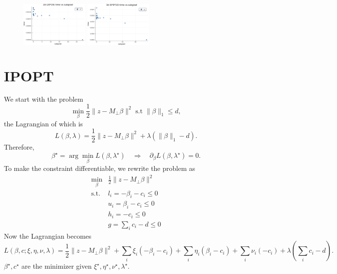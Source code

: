 \documentclass{article}
\begin{document}
\begin{figure}[H]
{\begin{minipage}[b]{1\textwidth}
		 	\includegraphics[width=0.3\textwidth]{2dtimevssubgrad.png}
            \includegraphics[width=0.3\textwidth]{3dtimevssubgrad.png}
    		\end{minipage}
		}
\end{figure}

\section{IPOPT}
We start with the problem
\begin{equation}
    \min_{\beta} \frac{1}{2}\|z-M_{\perp}\beta\|^2 \text{ s.t }\|\beta\|_1\leq d,
\end{equation}
the Lagrangian of which is
\begin{equation}
    L(\beta, \lambda) = \frac{1}{2}\|z-M_{\perp}\beta\|^2 + \lambda(\|\beta\|_1-d).
\end{equation}
Therefore,
\begin{equation}
   \beta^\star = \arg\min_{\beta} L(\beta, \lambda^\star) \quad\Rightarrow \quad\partial_{\beta} L(\beta, \lambda^\star) = 0. 
\end{equation}
To make the constraint differentiable, we rewrite the problem as
\begin{equation}
    \begin{aligned}
        \min_{\beta} &\frac{1}{2}\|z-M_{\perp}\beta\|^2\\
        \text{s.t. }&l_i = -\beta_i-c_i\leq 0\\
        &u_i = \beta_i-c_i\leq 0\\
        &h_i = -c_i\leq 0\\
        &g = \sum_{i}c_i-d\leq 0
    \end{aligned}
\end{equation}
Now the Lagrangian becomes
\begin{equation}
    L(\beta,c; \xi,\eta,\nu,\lambda)= 
     \frac{1}{2}\|z-M_{\perp}\beta\|^2
     +\sum_{i}\xi_i(-\beta_i-c_i)
     +\sum_{i}\eta_i(\beta_i-c_i)
     +\sum_{i}\nu_i(-c_i) + \lambda(\sum_{i}c_i-d).
\end{equation}
$\beta^\star, c^\star$ are the minimizer given $\xi^\star, \eta^\star, \nu^\star, \lambda^\star$.
\end{document}
